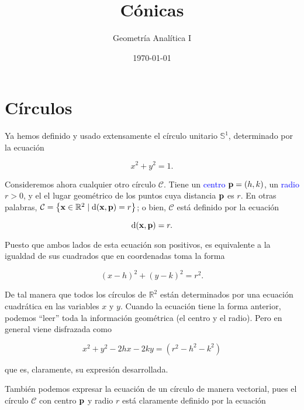 \documentclass{article}
\title{\Huge{Cónicas}}
\author{Geometría Analítica I}
\date{\today}
\theoremstyle{definicion}
\theoremstyle{definition}             %
\theoremstyle{definition}             %
\theoremstyle{definition}
\theoremstyle{definition}
\theoremstyle{observacion}
\theoremstyle{definition}
\theoremstyle{plain}
\theoremstyle{definition}
\theoremstyle{afirmacion}
\theoremstyle{notation}
\theoremstyle{definition}
\begin{document}
    \maketitle
    
    
    \section{Círculos}

    Ya hemos definido y usado extensamente el círculo unitario \(\mathbb{S}^{1}\), determinado por la ecuación

    \begin{equation*}
        x^{2} + y^{2} = 1.
    \end{equation*}

    Consideremos ahora cualquier otro círculo \(\mathcal{C}\). Tiene un \textcolor{blue}{centro}  \(\vb{p} = (h, k)\), un \textcolor{blue}{radio} \(r > 0\), y el el lugar geométrico de los puntos cuya distancia \(\vb{p}\) es \(r\). En otras palabras, \(\mathcal{C} = \left\lbrace \vb{x} \in \mathbb{R}^{2} \mid \textrm{d}(\vb{x}, \vb{p}) = r\right\rbrace\); o bien, \(\mathcal{C}\) está definido por la ecuación

    \begin{equation*}
        \textrm{d}(\vb{x}, \vb{p}) = r.
    \end{equation*}

    Puesto que ambos lados de esta ecuación son positivos, es equivalente a la igualdad de sus cuadrados que en coordenadas toma la forma

    \begin{equation}
        (x - h)^{2} + (y - k)^{2} = r^{2}.
    \end{equation}

    De tal manera que todos los círculos de \(\mathbb{R}^{2}\) están determinados por una ecuación cuadrática en las variables \(x\) y \(y\). Cuando la ecuación tiene la forma anterior, podemos ``leer'' toda la información geométrica (el centro y el radio). Pero en general viene disfrazada como

    \begin{equation*}
        x^{2} + y^{2} -2hx - 2ky = (r^{2} - h^{2} - k^{2}) 
    \end{equation*}

    que es, claramente, su expresión desarrollada.

    También podemos expresar la ecuación de un círculo de manera vectorial, pues el círculo \(\mathcal{C}\) con centro \(\vb{p}\) y radio \(r\) está claramente definido por la ecuación
\end{document}
